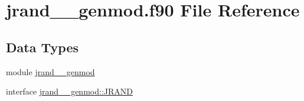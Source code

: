 \hypertarget{jrand____genmod_8f90}{\section{jrand\+\_\+\+\_\+genmod.\+f90 File Reference}
\label{jrand____genmod_8f90}
}
\subsection*{Data Types}
\begin{DoxyCompactItemize}
\item 
module \hyperlink{classjrand____genmod}{jrand\+\_\+\+\_\+genmod}
\item 
interface \hyperlink{interfacejrand____genmod_1_1JRAND}{jrand\+\_\+\+\_\+genmod\+::\+J\+R\+A\+N\+D}
\end{DoxyCompactItemize}
